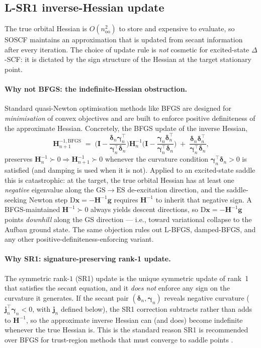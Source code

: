\documentclass[11pt,a4paper]{article}
\newcommand{\xx}{\mathbf{x}}
\newcommand{\gg}{\mathbf{g}}
\newcommand{\HH}{\mathbf{H}}
\newcommand{\II}{\mathbf{I}}
\begin{document}
\subsection{L-SR1 inverse-Hessian update}
\label{sec:lsr1}

The true orbital Hessian is $O(n_\mathrm{oo}^2)$ to store and expensive
to evaluate, so SOSCF maintains an approximation that is updated from
secant information after every iteration. The choice of update rule is
\emph{not} cosmetic for excited-state $\Delta$-SCF: it is dictated by
the sign structure of the Hessian at the target stationary point.

\paragraph{Why not BFGS: the indefinite-Hessian obstruction.}
Standard quasi-Newton optimisation methods like BFGS are designed for
\emph{minimisation} of convex objectives and are built to enforce
positive definiteness of the approximate Hessian. Concretely, the
BFGS update of the inverse Hessian,
\begin{equation}
\HH^{-1,\mathrm{BFGS}}_{n+1}
\;=\; \Big(\II - \frac{\bm{\delta}_n\bm{\gamma}_n^{\top}}{\bm{\gamma}_n^{\top}\bm{\delta}_n}\Big)
      \HH^{-1}_n
      \Big(\II - \frac{\bm{\gamma}_n\bm{\delta}_n^{\top}}{\bm{\gamma}_n^{\top}\bm{\delta}_n}\Big)
 \;+\; \frac{\bm{\delta}_n\bm{\delta}_n^{\top}}{\bm{\gamma}_n^{\top}\bm{\delta}_n},
\label{eq:bfgs}
\end{equation}
preserves $\HH^{-1}_n\succ 0\Rightarrow\HH^{-1}_{n+1}\succ 0$ whenever
the curvature condition $\bm{\gamma}_n^{\top}\bm{\delta}_n>0$ is
satisfied (and damping is used when it is not). Applied to an
excited-state saddle this is catastrophic: at the target, the true
orbital Hessian has at least one \emph{negative} eigenvalue along the
$\mathrm{GS}\to\mathrm{ES}$ de-excitation direction, and the
saddle-seeking Newton step $\mathrm{D}\xx=-\HH^{-1}\gg$ requires
$\HH^{-1}$ to inherit that negative sign. A BFGS-maintained
$\HH^{-1}\succ 0$ always yields descent directions, so
$\mathrm{D}\xx=-\HH^{-1}\gg$ points \emph{downhill} along the GS
direction --- i.e., toward variational collapse to the Aufbau ground
state. The same objection rules out L-BFGS, damped-BFGS, and any
other positive-definiteness-enforcing variant.

\paragraph{Why SR1: signature-preserving rank-1 update.}
The symmetric rank-$1$ (SR1) update is the unique symmetric update of
rank~1 that satisfies the secant equation, and it \emph{does not}
enforce any sign on the curvature it generates. If the secant pair
$(\bm{\delta}_n,\bm{\gamma}_n)$ reveals negative curvature
($\bm{j}_n^{\top}\bm{\gamma}_n<0$, with $\bm{j}_n$ defined below), the
SR1 correction subtracts rather than adds to $\HH^{-1}$, so the
approximate inverse Hessian can (and does) become indefinite whenever
the true Hessian is. This is the standard reason SR1 is recommended
over BFGS for trust-region methods that must converge to saddle
points \cite[Ch.~6]{NocedalWright}.
\end{document}
